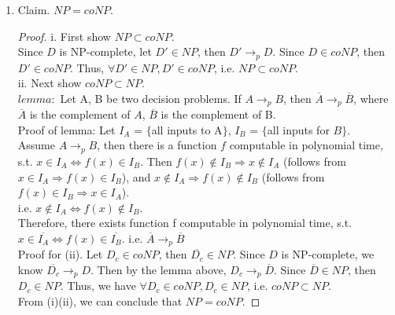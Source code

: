 \documentclass[11pt]{article}
\begin{document}
\begin{enumerate}
\begin{enumerate}
    \item Claim. $NP = coNP$.
    \begin{proof}
        i. First show $NP \subset coNP$.\\
        Since $D$ is NP-complete, let $D' \in NP$, then $D' \rightarrow_p D$. Since $D \in coNP$, then $D' \in coNP$. Thus, $\forall D' \in NP, D' \in coNP$, i.e. $NP \subset coNP$.\\
        
        ii. Next show $coNP \subset NP$.\\
        $lemma: $ Let A, B be two decision problems. If $A \rightarrow_p B$, then $\overline{A} \rightarrow_p \overline{B}$, where $\overline{A}$ is the complement of $A$, $\overline{B}$ is the complement of B.\\
        Proof of lemma:  Let $I_A$ = $\{$all inputs to A$\}$, $I_B$ = $\{$all inputs for $B\}$.\\
        Assume $A \rightarrow_p B$, then there is a function $f$ computable in polynomial time, s.t. $x \in I_A \Longleftrightarrow f(x) \in I_B$. Then $f(x) \not\in I_B \Rightarrow x \not\in I_A$ (follows from $x\in I_A \Rightarrow f(x) \in I_B$), and $x \not\in I_A \Rightarrow f(x) \not\in I_B$ (follows from $f(x)\in I_B \Rightarrow x\in I_A$).\\
        i.e. $x \not\in I_A \Longleftrightarrow f(x) \not\in I_B$.\\
        Therefore, there exists function f computable in polynomial time, s.t. $x \in \overline{I_A} \Longleftrightarrow f(x) \in \overline{I_B}$. i.e. $\overline{A} \rightarrow_p \overline{B}$\\[2ex]
        Proof for (ii). Let $D_c \in coNP$, then $\overline{D_c} \in NP$. Since $D$ is NP-complete, we know $\overline{D_c} \rightarrow_p D$. Then by the lemma above, $D_c \rightarrow_p \overline{D}$. Since $\overline{D} \in NP$, then $D_c \in NP$. Thus, we have $\forall D_c \in coNP, D_c \in NP$, i.e. $coNP \subset NP$.\\[2ex]
        From (i)(ii), we can conclude that $NP = coNP$.
    \end{proof}
\end{enumerate}

\end{enumerate}
\end{document}
